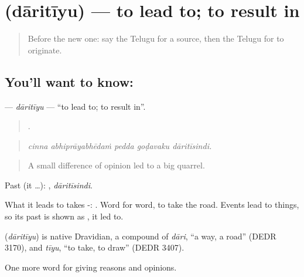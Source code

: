 \section[\texorpdfstring{\te{దారితీయు} (dāritīyu)}{దారితీయు (dāritīyu)}]{ (dāritīyu) — to lead to; to result in}

\label{lesson:TE-C392-daritiyu}



\begin{quote}
Before the new one: say the Telugu for a source, then the Telugu for to originate.
\end{quote}

\subsection*{You'll want to know: }
\textbf{} — \emph{dāritīyu} — \textquotedblleft{}to lead to; to result in\textquotedblright{}.

\begin{quote}
    .
\end{quote}

\begin{quote}
\emph{cinna abhiprāyabhēdaṁ pedda goḍavaku dāritīsindi.}
\end{quote}

\begin{quote}
A small difference of opinion led to a big quarrel.
\end{quote}

Past (it …): , \emph{dāritīsindi}.

What it leads to takes -:  . Word for word, to take the road. Events lead to things, so its past is shown as , it led to.

\begin{cousinweb}
\textbf{} (\emph{dāritīyu}) is native Dravidian, a compound of \emph{dāri}, \textquotedblleft{}a way, a road\textquotedblright{} (DEDR 3170), and \emph{tīyu}, \textquotedblleft{}to take, to draw\textquotedblright{} (DEDR 3407).
\end{cousinweb}

\begin{grammarlens}[title={What you've built}]
One more word for giving reasons and opinions.
\end{grammarlens}


